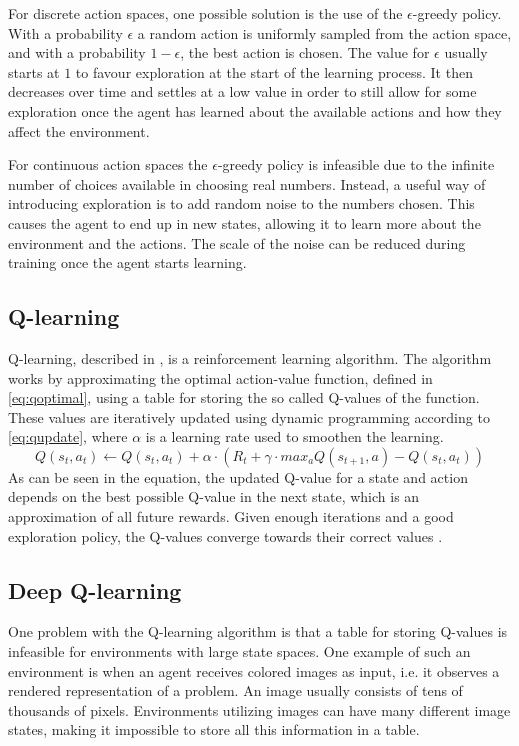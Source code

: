 \documentclass{kththesis}
\begin{document}
For discrete action spaces, one possible solution is the use of the $\epsilon$-greedy policy. With a probability $\epsilon$ a random action is uniformly sampled from the action space, and with a probability $1 - \epsilon$, the best action is chosen. The value for $\epsilon$ usually starts at $1$ to favour exploration at the start of the learning process. It then decreases over time and settles at a low value in order to still allow for some exploration once the agent has learned about the available actions and how they affect the environment. \parencite{sutton1998introduction}

For continuous action spaces the $\epsilon$-greedy policy is infeasible due to the infinite number of choices available in choosing real numbers. Instead, a useful way of introducing exploration is to add random noise to the numbers chosen. This causes the agent to end up in new states, allowing it to learn more about the environment and the actions. The scale of the noise can be reduced during training once the agent starts learning. \parencite{lillicrap2015continuous}

\subsection{Q-learning}
\label{subsec:qlearning}
Q-learning, described in \parencite{watkins1992q}, is a reinforcement learning algorithm. The algorithm works by approximating the optimal action-value function, defined in \autoref{eq:qoptimal}, using a table for storing the so called Q-values of the function. These values are iteratively updated using dynamic programming according to \autoref{eq:qupdate}, where $\alpha$ is a learning rate used to smoothen the learning. 
\begin{equation}
\label{eq:qupdate}
Q(s_t, a_t) \leftarrow Q(s_t, a_t) + \alpha \cdot (R_t + \gamma \cdot max_a Q(s_{t+1}, a) - Q(s_t, a_t))
\end{equation}
As can be seen in the equation, the updated Q-value for a state and action depends on the best possible Q-value in the next state, which is an approximation of all future rewards. Given enough iterations and a good exploration policy, the Q-values converge towards their correct values \parencite{watkins1992q}.

\subsection{Deep Q-learning}
\label{subsec:deepqlearning}
One problem with the Q-learning algorithm is that a table for storing Q-values is infeasible for environments with large state spaces. One example of such an environment is when an agent receives colored images as input, i.e. it observes a rendered representation of a problem. An image usually consists of tens of thousands of pixels. Environments utilizing images can have many different image states, making it impossible to store all this information in a table.
\end{document}

